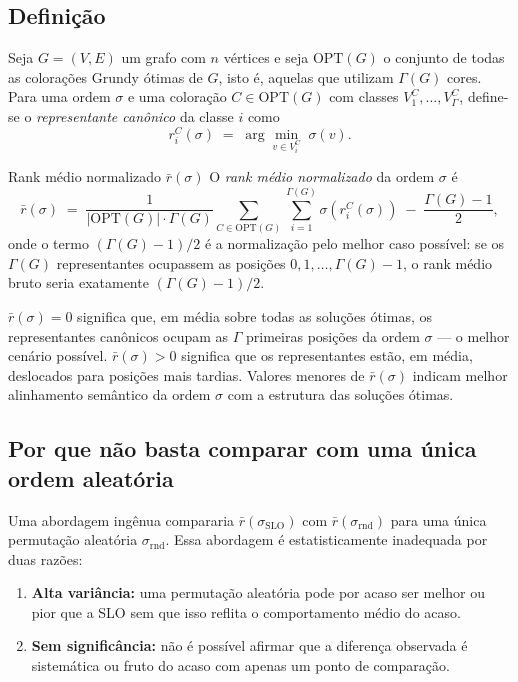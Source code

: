 \documentclass[a4paper,11pt]{article}
\begin{document}
\subsection{Definição}

Seja $G = (V,E)$ um grafo com $n$ vértices e seja $\text{OPT}(G)$ o
conjunto de todas as colorações Grundy ótimas de $G$, isto é, aquelas
que utilizam $\Gamma(G)$ cores. Para uma ordem $\sigma$ e uma coloração
$C \in \text{OPT}(G)$ com classes $V_1^C, \ldots, V_{\Gamma}^C$,
define-se o \emph{representante canônico} da classe $i$ como
\[
  r_i^C(\sigma) \;=\; \arg\min_{v \in V_i^C}\; \sigma(v).
\]

\begin{definicao}{Rank médio normalizado $\bar{r}(\sigma)$}
O \emph{rank médio normalizado} da ordem $\sigma$ é
\[
  \bar{r}(\sigma) \;=\;
  \frac{1}{|\text{OPT}(G)| \cdot \Gamma(G)}
  \sum_{C \in \text{OPT}(G)} \sum_{i=1}^{\Gamma(G)} \sigma\!\left(r_i^C(\sigma)\right)
  \;-\; \frac{\Gamma(G)-1}{2},
\]
onde o termo $(\Gamma(G)-1)/2$ é a normalização pelo melhor caso
possível: se os $\Gamma(G)$ representantes ocupassem as posições
$0, 1, \ldots, \Gamma(G)-1$, o rank médio bruto seria exatamente
$(\Gamma(G)-1)/2$.
\end{definicao}

\begin{intuicao}
$\bar{r}(\sigma) = 0$ significa que, em média sobre todas as soluções
ótimas, os representantes canônicos ocupam as $\Gamma$ primeiras
posições da ordem $\sigma$ — o melhor cenário possível.
$\bar{r}(\sigma) > 0$ significa que os representantes estão, em média,
deslocados para posições mais tardias.
Valores menores de $\bar{r}(\sigma)$ indicam melhor alinhamento
semântico da ordem $\sigma$ com a estrutura das soluções ótimas.
\end{intuicao}

\subsection{Por que não basta comparar com uma única ordem aleatória}

Uma abordagem ingênua compararia $\bar{r}(\sigma_{\text{SLO}})$ com
$\bar{r}(\sigma_{\text{rnd}})$ para uma única permutação aleatória
$\sigma_{\text{rnd}}$. Essa abordagem é estatisticamente inadequada
por duas razões:

\begin{enumerate}
  \item \textbf{Alta variância:} uma permutação aleatória pode por
    acaso ser melhor ou pior que a SLO sem que isso reflita o
    comportamento médio do acaso.
  \item \textbf{Sem significância:} não é possível afirmar que a
    diferença observada é sistemática ou fruto do acaso com apenas
    um ponto de comparação.
\end{enumerate}
\end{document}
